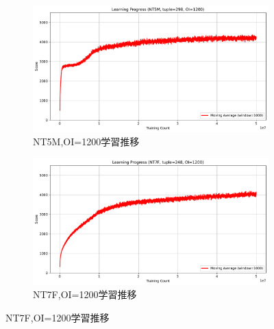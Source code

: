 \begin{figure}[t]
    \vspace{1em}
    \begin{subfigure}[b]{0.49\linewidth}
        \includegraphics[width=\linewidth]{pdf/learning_progress_plots/learning_progress_NT5_tuple298_OI1200.pdf}
        \caption{NT5M,OI=1200学習推移}
        \label{fig:NT5M_OI1200_learning_progress}
    \end{subfigure}
    \begin{subfigure}[b]{0.49\linewidth}
        \includegraphics[width=\linewidth]{pdf/learning_progress_plots/learning_progress_NT7_tuple248_OI1200.pdf}
        \caption{NT7F,OI=1200学習推移}
        \label{fig:NT7F_OI1200_learning_progress}
    \end{subfigure}


\end{figure}
